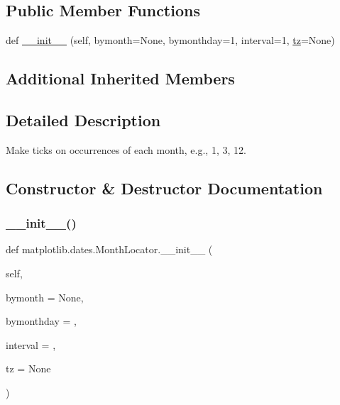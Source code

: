 \subsection*{Public Member Functions}
\begin{DoxyCompactItemize}
\item 
def \hyperlink{classmatplotlib_1_1dates_1_1MonthLocator_aa659050e046c56f429f495060422e2cf}{\+\_\+\+\_\+init\+\_\+\+\_\+} (self, bymonth=None, bymonthday=1, interval=1, \hyperlink{classmatplotlib_1_1dates_1_1DateLocator_aa18faf34dbf00ed4820535b64cd7194e}{tz}=None)
\end{DoxyCompactItemize}
\subsection*{Additional Inherited Members}


\subsection{Detailed Description}
\begin{DoxyVerb}Make ticks on occurrences of each month, e.g., 1, 3, 12.
\end{DoxyVerb}
 

\subsection{Constructor \& Destructor Documentation}
\mbox{\label{classmatplotlib_1_1dates_1_1MonthLocator_aa659050e046c56f429f495060422e2cf}} 
\subsubsection{\texorpdfstring{\+\_\+\+\_\+init\+\_\+\+\_\+()}{\_\_init\_\_()}}
{\footnotesize\ttfamily def matplotlib.\+dates.\+Month\+Locator.\+\_\+\+\_\+init\+\_\+\+\_\+ (\begin{DoxyParamCaption}\item[{}]{self,  }\item[{}]{bymonth = {\ttfamily None},  }\item[{}]{bymonthday = {},  }\item[{}]{interval = {},  }\item[{}]{tz = {\ttfamily None} }\end{DoxyParamCaption})}

